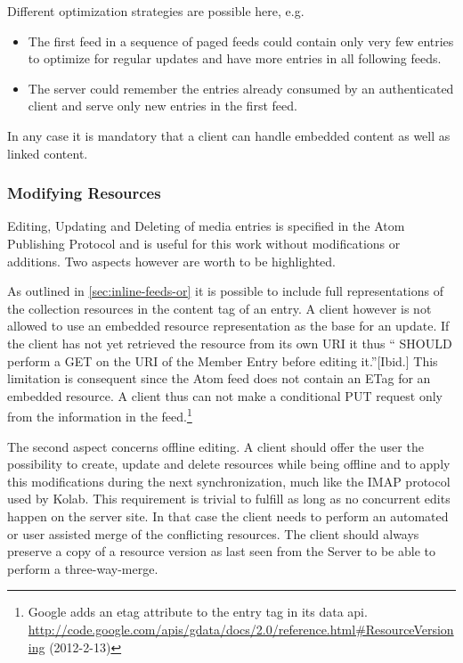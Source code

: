 \documentclass[12pt,a4paper]{scrartcl}		%
\newcommand{\citeurl}[2]{\url{#1} (#2)}
\begin{document}
Different optimization strategies are possible here, e.g.

\begin{itemize}
\item The first feed in a sequence of paged feeds could contain only very few
  entries to optimize for regular updates and have more entries in all following
  feeds.
\item The server could remember the entries already consumed by an authenticated
  client and serve only new entries in the first feed.
\end{itemize}

In any case it is mandatory that a client can handle embedded content as well as
linked content.

\subsubsection{Modifying Resources}

Editing, Updating and Deleting of media entries is specified in the Atom
Publishing Protocol and is useful for this work without modifications or
additions. Two aspects however are worth to be highlighted.

As outlined in \autoref{sec:inline-feeds-or} it is possible to include full
representations of the collection resources in the content tag of an entry. A
client however is not allowed to use an embedded resource representation as the
base for an update\cite[sec. 10]{RFC5023}. If the client has not yet retrieved
the resource from its own URI it thus `` SHOULD perform a GET on the URI of the
Member Entry before editing it.''[Ibid.] This limitation is consequent since the
Atom feed does not contain an ETag for an embedded resource. A client thus can
not make a conditional PUT request only from the information in the
feed.\footnote{Google adds an etag attribute to the entry tag in its data
  api. \citeurl{http://code.google.com/apis/gdata/docs/2.0/reference.html\#ResourceVersioning}{2012-2-13}}

The second aspect concerns offline editing. A client should offer the user the
possibility to create, update and delete resources while being offline and to
apply this modifications during the next synchronization, much like the IMAP
protocol used by Kolab. This requirement is trivial to fulfill as long as no
concurrent edits happen on the server site. In that case the client needs to
perform an automated or user assisted merge of the conflicting resources. The
client should always preserve a copy of a resource version as last seen from the
Server to be able to perform a three-way-merge.
\end{document}
